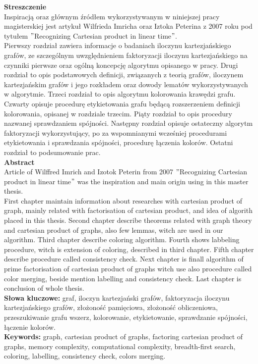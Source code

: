 \documentclass[12pt,a4paper,titlepage]{article}
\newcommand\tab[1][1cm]{\hspace*{#1}}
\begin{document}
\textbf{Streszczenie}\\
\tab[0.6cm]Inspiracją oraz głównym źródłem wykorzystywanym w niniejszej pracy magisterskiej jest artykuł Wilfrieda Imricha oraz Iztoka Peterina z 2007 roku pod tytułem $"$Recognizing Cartesian product in linear time$"$. \\
\tab[0.6cm]Pierwszy rozdział zawiera informacje o badaniach iloczynu kartezjańskiego grafów, ze szczególnym uwzględnieniem faktoryzacji iloczynu kartezjańskiego na czynniki pierwsze oraz ogólną koncepcję algorytmu opisanego w pracy. Drugi rozdział to opis podstawowych definicji, związanych z teorią grafów, iloczynem kartezjańskim grafów i jego rozkładem oraz dowody lematów wykorzystywanych w algorytmie. Trzeci rozdział to opis algorytmu kolorowania krawędzi grafu. Czwarty opisuje procedurę etykietowania grafu będącą rozszerzeniem definicji kolorowania, opisanej w rozdziale trzecim. Piąty rozdział to opis procedury nazwanej sprawdzaniem spójności. Następny rozdział opisuje ostateczny algorytm faktoryzacji wykorzystujący, po za wspomnianymi wcześniej procedurami etykietowania i sprawdzania spójności, procedurę łączenia kolorów. Ostatni rozdział to podsumowanie prac.\\
\tab[0.6cm]\textbf{Abstract}\\
\tab[0.6cm]Article of Wilffred Imrich and Izotok Peterin from 2007 $"$Recognizing Cartesian product in linear time$"$ was the inspiration and main origin using in this master thesis.\\
\tab[0.6cm]First chapter maintain information about researches with cartesian product of graph, mainly related with factorisation of cartesian product, and idea of algorith placed in this thesis. Second chapter describe theorems related with graph theory and cartesian product of graphs, also few lemmas, witch are used in our algorithm. Third chapter describe coloring algorithm. Fourth shows labbeling procedure, witch is extension of coloring, described in third chapter. Fifth chapter describe procedure called consistency check. Next chapter is finall algorithm of prime factorisation of cartesian product of graphs witch use also procedure called color merging, beside mention labelling and consistency check. Last chapter is conclusion of whole thesis.\\
\tab[0.6cm]\textbf{Słowa kluczowe:} graf, iloczyn kartezjański grafów, faktoryzacja iloczynu kartezjańskiego grafów, złożoność pamięciowa, złożoność obliczeniowa, przeszukiwanie grafu wszerz, kolorowanie,
etykietowanie, sprawdzanie spójności, łączenie kolorów.\\
\tab[0.6cm]\textbf{Keywords:} graph, cartesian product of graphs, factoring cartesian product of graphs, memory complexity, computational complexity, breadth-first search, coloring,
labelling, consistency check, colors merging.
\newpage
\tableofcontents
{}
\newpage
\end{document}
